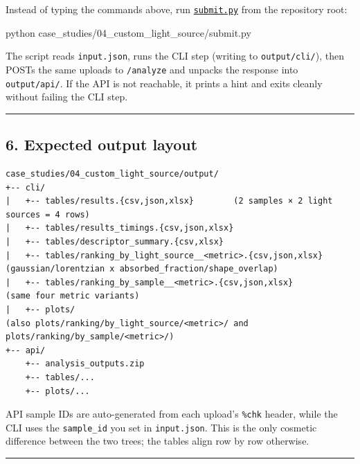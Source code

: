 \documentclass[
  11pt,
]{article}
\newenvironment{Shaded}{}{}
\newcommand{\ExtensionTok}[1]{#1}
\newcommand{\NormalTok}[1]{#1}
\begin{document}
Instead of typing the commands above, run
\href{https://github.com/pinarsyt/overlap-calculator/blob/main/case_studies/04_custom_light_source/submit.py}{\texttt{submit.py}}
from the repository root:

\begin{Shaded}
\begin{Highlighting}[]
\ExtensionTok{python}\NormalTok{ case\_studies/04\_custom\_light\_source/submit.py}
\end{Highlighting}
\end{Shaded}

The script reads \texttt{input.json}, runs the CLI step (writing to
\texttt{output/cli/}), then POSTs the same uploads to \texttt{/analyze}
and unpacks the response into \texttt{output/api/}. If the API is not
reachable, it prints a hint and exits cleanly without failing the CLI
step.

\begin{center}\rule{0.5\linewidth}{0.5pt}\end{center}

\hypertarget{6-expected-output-layout}{
\subsection{6. Expected output layout}\label{6-expected-output-layout}}

\begin{verbatim}
case_studies/04_custom_light_source/output/
+-- cli/
|   +-- tables/results.{csv,json,xlsx}        (2 samples × 2 light sources = 4 rows)
|   +-- tables/results_timings.{csv,json,xlsx}
|   +-- tables/descriptor_summary.{csv,xlsx}
|   +-- tables/ranking_by_light_source__<metric>.{csv,json,xlsx}   (gaussian/lorentzian x absorbed_fraction/shape_overlap)
|   +-- tables/ranking_by_sample__<metric>.{csv,json,xlsx}          (same four metric variants)
|   +-- plots/                                                      (also plots/ranking/by_light_source/<metric>/ and plots/ranking/by_sample/<metric>/)
+-- api/
    +-- analysis_outputs.zip
    +-- tables/...
    +-- plots/...
\end{verbatim}

API sample IDs are auto-generated from each upload's \texttt{\%chk}
header, while the CLI uses the \texttt{sample\_id} you set in
\texttt{input.json}. This is the only cosmetic difference between the
two trees; the tables align row by row otherwise.

\begin{center}\rule{0.5\linewidth}{0.5pt}\end{center}
\end{document}
